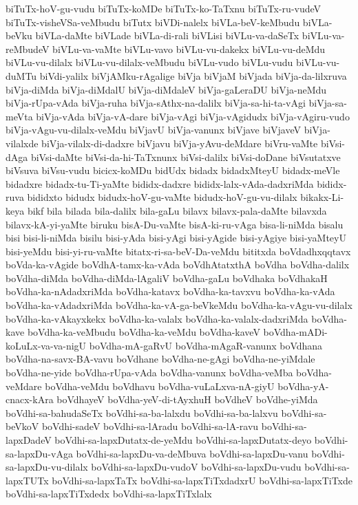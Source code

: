 {biTuTx-hoV-gu-vudu
biTuTx-koMDe
biTuTx-ko-TaTxnu
biTuTx-ru-vudeV
biTuTx-visheVSa-veMbudu
biTutx
biVDi-nalelx
biVLa-beV-keMbudu
biVLa-beVku
biVLa-daMte
biVLade
biVLa-di-rali
biVLisi
biVLu-va-daSeTx
biVLu-va-reMbudeV
biVLu-va-vaMte
biVLu-vavo
biVLu-vu-dakekx
biVLu-vu-deMdu
biVLu-vu-dilalx
biVLu-vu-dilalx-veMbudu
biVLu-vudo
biVLu-vudu
biVLu-vu-duMTu
biVdi-yalilx
biVjAMku-rAgalige
biVja
biVjaM
biVjada
biVja-da-lilxruva
biVja-diMda
biVja-diMdalU
biVja-diMdaleV
biVja-gaLeraDU
biVja-neMdu
biVja-rUpa-vAda
biVja-ruha
biVja-sAthx-na-dalilx
biVja-sa-hi-ta-vAgi
biVja-sa-meVta
biVja-vAda
biVja-vA-dare
biVja-vAgi
biVja-vAgidudx
biVja-vAgiru-vudo
biVja-vAgu-vu-dilalx-veMdu
biVjavU
biVja-vanunx
biVjave
biVjaveV
biVja-vilalxde
biVja-vilalx-di-dadxre
biVjavu
biVja-yAvu-deMdare
biVru-vaMte
biVsi-dAga
biVsi-daMte
biVsi-da-hi-TaTxnunx
biVsi-dalilx
biVsi-doDane
biVsutatxve
biVsuva
biVsu-vudu
bicicx-koMDu
bidUdx
bidadx
bidadxMteyU
bidadx-meVle
bidadxre
bidadx-tu-Ti-yaMte
bididx-dadxre
bididx-lalx-vAda-dadxriMda
bididx-ruva
bididxto
bidudx
bidudx-hoV-gu-vaMte
bidudx-hoV-gu-vu-dilalx
bikakx-Li-keya
bikf
bila
bilada
bila-dalilx
bila-gaLu
bilavx
bilavx-pala-daMte
bilavxda
bilavx-kA-yi-yaMte
biruku
bisA-Du-vaMte
bisA-ki-ru-vAga
bisa-li-niMda
bisalu
bisi
bisi-li-niMda
bisilu
bisi-yAda
bisi-yAgi
bisi-yAgide
bisi-yAgiye
bisi-yaMteyU
bisi-yeMdu
bisi-yi-ru-vaMte
bitatx-ri-sa-beV-Da-veMdu
bititxda
boVdadhxqqtavx
boVda-ka-vAgide
boVdhA-tamx-ka-vAda
boVdhAtatxthA
boVdha
boVdha-dalilx
boVdha-diMda
boVdha-diMda-lAgaliV
boVdha-gaLu
boVdhaka
boVdhakaH
boVdha-ka-nAdadxriMda
boVdha-katavx
boVdha-ka-tavxvu
boVdha-ka-vAda
boVdha-ka-vAdadxriMda
boVdha-ka-vA-ga-beVkeMdu
boVdha-ka-vAgu-vu-dilalx
boVdha-ka-vAkayxkekx
boVdha-ka-valalx
boVdha-ka-valalx-dadxriMda
boVdha-kave
boVdha-ka-veMbudu
boVdha-ka-veMdu
boVdha-kaveV
boVdha-mADi-koLuLx-va-va-nigU
boVdha-mA-gaRvU
boVdha-mAgaR-vanunx
boVdhana
boVdha-na-savx-BA-vavu
boVdhane
boVdha-ne-gAgi
boVdha-ne-yiMdale
boVdha-ne-yide
boVdha-rUpa-vAda
boVdha-vanunx
boVdha-veMba
boVdha-veMdare
boVdha-veMdu
boVdhavu
boVdha-vuLaLxva-nA-giyU
boVdha-yA-cnacx-kAra
boVdhayeV
boVdha-yeV-di-tAyxhuH
boVdheV
boVdhe-yiMda
boVdhi-sa-bahudaSeTx
boVdhi-sa-ba-lalxdu
boVdhi-sa-ba-lalxvu
boVdhi-sa-beVkoV
boVdhi-sadeV
boVdhi-sa-lAradu
boVdhi-sa-lA-ravu
boVdhi-sa-lapxDadeV
boVdhi-sa-lapxDutatx-de-yeMdu
boVdhi-sa-lapxDutatx-deyo
boVdhi-sa-lapxDu-vAga
boVdhi-sa-lapxDu-va-deMbuva
boVdhi-sa-lapxDu-vanu
boVdhi-sa-lapxDu-vu-dilalx
boVdhi-sa-lapxDu-vudoV
boVdhi-sa-lapxDu-vudu
boVdhi-sa-lapxTUTx
boVdhi-sa-lapxTaTx
boVdhi-sa-lapxTiTxdadxrU
boVdhi-sa-lapxTiTxde
boVdhi-sa-lapxTiTxdedx
boVdhi-sa-lapxTiTxlalx
}
